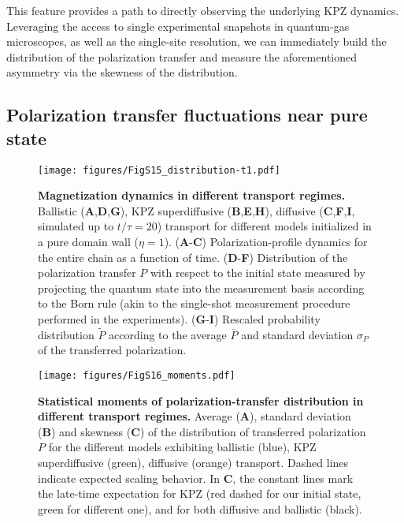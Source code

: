 \documentclass[
 reprint,
 superscriptaddress,
 amsmath,amssymb,
 aps,
 pra,
]{revtex4-2}
\begin{document}
This feature provides a path to directly observing the underlying KPZ dynamics. 
Leveraging the access to single experimental snapshots in quantum-gas microscopes, as well as the single-site resolution, we can immediately build the distribution of the polarization transfer and measure the aforementioned asymmetry via the skewness of the distribution.


\subsection{Polarization transfer fluctuations near pure state}

\begin{figure*}
    \centering
    \texttt{[image: figures/FigS15\_distribution-t1.pdf]}
    \caption{\textbf{Magnetization dynamics in different transport regimes.}
        Ballistic (\textbf{A},\textbf{D},\textbf{G}), KPZ superdiffusive (\textbf{B},\textbf{E},\textbf{H}), diffusive (\textbf{C},\textbf{F},\textbf{I}, simulated up to $t/\tau = 20$) transport for different models initialized in a pure domain wall ($\eta = 1$).
        (\textbf{A}-\textbf{C}) Polarization-profile dynamics for the entire chain as a function of time.
        (\textbf{D}-\textbf{F}) Distribution of the polarization transfer $P$ with respect to the initial state measured by projecting the quantum state into the measurement basis according to the Born rule (akin to the single-shot measurement procedure performed in the experiments).
        (\textbf{G}-\textbf{I}) Rescaled probability distribution $\tilde{P}$ according to the average $\overline{P}$ and standard deviation $\sigma_P$ of the transferred polarization.
    }
    \label{fig:MPSFluctuations}
\end{figure*}

\begin{figure*}
    \centering
    \texttt{[image: figures/FigS16\_moments.pdf]}
    \caption{\textbf{Statistical moments of polarization-transfer distribution in different transport regimes.}
        Average (\textbf{A}), standard deviation (\textbf{B}) and skewness (\textbf{C}) of the distribution of transferred polarization $P$ for the different models exhibiting ballistic (blue), KPZ superdiffusive (green), diffusive (orange) transport. Dashed lines indicate expected scaling behavior. In \textbf{C}, the constant lines mark the late-time expectation for KPZ (red dashed for our initial state, green for different one), and for both diffusive and ballistic (black).
    }
    \label{fig:MPSMoments}
\end{figure*}
\end{document}
